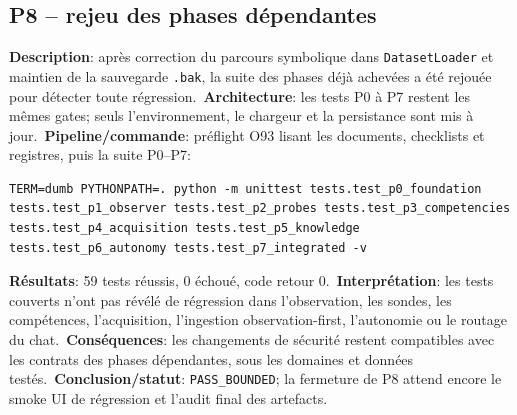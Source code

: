 \documentclass[11pt,a4paper,oneside]{report}
\begin{document}
\subsection{P8 -- rejeu des phases dépendantes}
\textbf{Description}: après correction du parcours symbolique dans \texttt{DatasetLoader} et maintien de la sauvegarde \texttt{.bak}, la suite des phases déjà achevées a été rejouée pour détecter toute régression.\
\textbf{Architecture}: les tests P0 à P7 restent les mêmes gates; seuls l'environnement, le chargeur et la persistance sont mis à jour.\
\textbf{Pipeline/commande}: préflight O93 lisant les documents, checklists et registres, puis la suite P0--P7:
\begin{lstlisting}[basicstyle=\ttfamily\small,breaklines=true]
TERM=dumb PYTHONPATH=. python -m unittest tests.test_p0_foundation tests.test_p1_observer tests.test_p2_probes tests.test_p3_competencies tests.test_p4_acquisition tests.test_p5_knowledge tests.test_p6_autonomy tests.test_p7_integrated -v
\end{lstlisting}
\textbf{Résultats}: 59 tests réussis, 0 échoué, code retour 0.\
\textbf{Interprétation}: les tests couverts n'ont pas révélé de régression dans l'observation, les sondes, les compétences, l'acquisition, l'ingestion observation-first, l'autonomie ou le routage du chat.\
\textbf{Conséquences}: les changements de sécurité restent compatibles avec les contrats des phases dépendantes, sous les domaines et données testés.\
\textbf{Conclusion/statut}: \texttt{PASS\_BOUNDED}; la fermeture de P8 attend encore le smoke UI de régression et l'audit final des artefacts.
\end{document}
